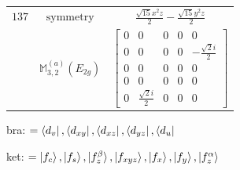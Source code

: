 \documentclass[fleqn,8pt,landscape]{jsarticle}
\begin{document}
\begin{longtable}{ccc}
$ 137 $ & $ \text{symmetry} $ & $ \frac{\sqrt{15} x^{2} z}{2} - \frac{\sqrt{15} y^{2} z}{2} $ \\
$  $ & $ \mathbb{M}_{3,2}^{(a)}(E_{2g}) $ & $ \begin{bmatrix} 0 & 0 & 0 & 0 & 0 \\ 0 & 0 & 0 & 0 & - \frac{\sqrt{2} i}{2} \\ 0 & 0 & 0 & 0 & 0 \\ 0 & 0 & 0 & 0 & 0 \\ 0 & \frac{\sqrt{2} i}{2} & 0 & 0 & 0 \end{bmatrix} $ \\ \hline
\end{longtable}
bra: $=\bra{d_{v}}, \bra{d_{xy}}, \bra{d_{xz}}, \bra{d_{yz}}, \bra{d_{u}}$

\noindent
ket: $=\ket{f_{c}}, \ket{f_{s}}, \ket{f_{z}^{\beta}}, \ket{f_{xyz}}, \ket{f_{x}}, \ket{f_{y}}, \ket{f_{z}^{\alpha}}$
\renewcommand{\arraystretch}{1.6}
\end{document}
